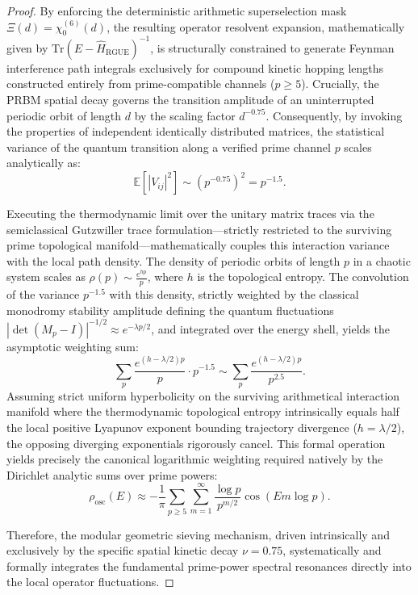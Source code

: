\documentclass[aps,prl,preprint,superscriptaddress,floatfix]{revtex4-2}
\begin{document}
\begin{proof}
By enforcing the deterministic arithmetic superselection mask $\Xi(d) = \chi_0^{(6)}(d)$, the resulting operator resolvent expansion, mathematically given by $\text{Tr}(E - \hat{H}_{\text{RGUE}})^{-1}$, is structurally constrained to generate Feynman interference path integrals exclusively for compound kinetic hopping lengths constructed entirely from prime-compatible channels ($p \ge 5$).
Crucially, the PRBM spatial decay governs the transition amplitude of an uninterrupted periodic orbit of length $d$ by the scaling factor $d^{-0.75}$.
Consequently, by invoking the properties of independent identically distributed matrices, the statistical variance of the quantum transition along a verified prime channel $p$ scales analytically as:
\begin{equation}
\mathbb{E}[|V_{ij}|^2] \sim (p^{-0.75})^2 = p^{-1.5}.
\end{equation}

Executing the thermodynamic limit over the unitary matrix traces via the semiclassical Gutzwiller trace formulation—strictly restricted to the surviving prime topological manifold—mathematically couples this interaction variance with the local path density.
The density of periodic orbits of length $p$ in a chaotic system scales as $\rho(p) \sim \frac{e^{h p}}{p}$, where $h$ is the topological entropy.
The convolution of the variance $p^{-1.5}$ with this density, strictly weighted by the classical monodromy stability amplitude defining the quantum fluctuations $|\det(M_p - I)|^{-1/2} \approx e^{-\lambda p / 2}$, and integrated over the energy shell, yields the asymptotic weighting sum:
\begin{equation}
\sum_{p} \frac{e^{(h - \lambda/2) p}}{p} \cdot p^{-1.5} \sim \sum_{p} \frac{e^{(h - \lambda/2) p}}{p^{2.5}}.
\end{equation}
Assuming strict uniform hyperbolicity on the surviving arithmetical interaction manifold where the thermodynamic topological entropy intrinsically equals half the local positive Lyapunov exponent bounding trajectory divergence ($h = \lambda / 2$), the opposing diverging exponentials rigorously cancel. This formal operation yields precisely the canonical logarithmic weighting required natively by the Dirichlet analytic sums over prime powers:
\begin{equation}
\rho_{\text{osc}}(E) \approx -\frac{1}{\pi} \sum_{p \ge 5} \sum_{m=1}^{\infty} \frac{\log p}{p^{m/2}} \cos(E m \log p).
\end{equation}

Therefore, the modular geometric sieving mechanism, driven intrinsically and exclusively by the specific spatial kinetic decay $\nu=0.75$, systematically and formally integrates the fundamental prime-power spectral resonances directly into the local operator fluctuations.
\end{proof}
\end{document}
